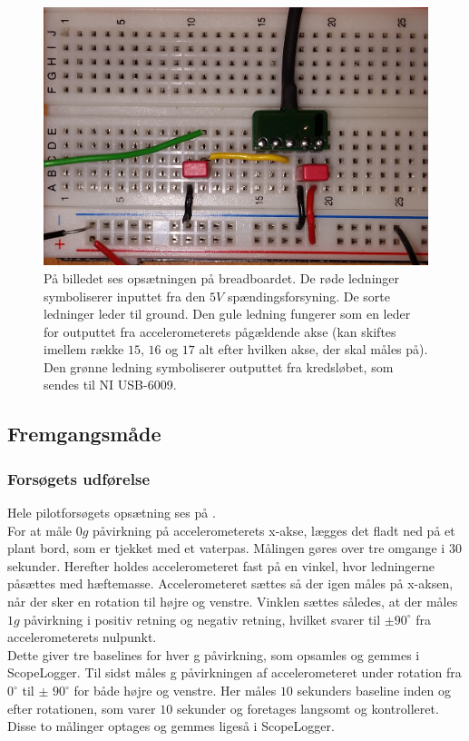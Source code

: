 \begin{figure}[H]
	\centering
	\includegraphics[scale=0.15]{figures/cProblemloesning/PF2.jpg}
	\caption{På billedet ses opsætningen på breadboardet. De røde ledninger symboliserer inputtet fra den $5V$ spændingsforsyning. De sorte ledninger leder til ground. Den gule ledning fungerer som en leder for outputtet fra accelerometerets pågældende akse (kan skiftes imellem række $15$, $16$ og $17$ alt efter hvilken akse, der skal måles på). Den grønne ledning symboliserer outputtet fra kredsløbet, som sendes til NI USB-6009.}
	\label{pforsoeg1}
\end{figure}

\subsection{Fremgangsmåde}
\subsubsection{Forsøgets udførelse}
Hele pilotforsøgets opsætning ses på . \\
For at måle $0g$ påvirkning på accelerometerets x-akse, lægges det fladt ned på et plant bord, som er tjekket med et vaterpas. Målingen gøres over tre omgange i $30$ sekunder. Herefter holdes accelerometeret fast på en vinkel, hvor ledningerne påsættes med hæftemasse. Accelerometeret sættes så der igen måles på x-aksen, når der sker en rotation til højre og venstre. Vinklen sættes således, at der måles $1g$ påvirkning i positiv retning og negativ retning, hvilket svarer til $\pm90^{\circ}$ fra accelerometerets nulpunkt. \\
Dette giver tre baselines for hver g påvirkning, som opsamles og gemmes i ScopeLogger. %
Til sidst måles g påvirkningen af accelerometeret under rotation fra $0^{\circ}$ til $\pm$ $90^{\circ}$ for både højre og venstre. Her måles $10$ sekunders baseline inden og efter rotationen, som varer $10$ sekunder og foretages langsomt og kontrolleret. Disse to målinger optages og gemmes ligeså i ScopeLogger. \\
